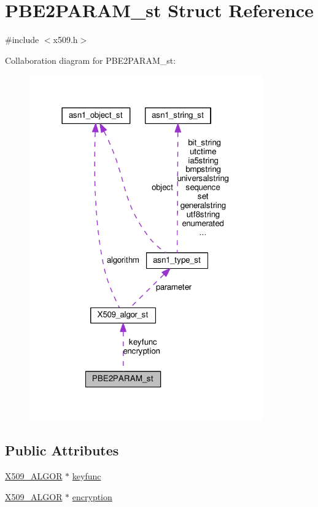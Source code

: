 \hypertarget{struct_p_b_e2_p_a_r_a_m__st}{}\section{P\+B\+E2\+P\+A\+R\+A\+M\+\_\+st Struct Reference}
\label{struct_p_b_e2_p_a_r_a_m__st}


{\ttfamily \#include $<$x509.\+h$>$}



Collaboration diagram for P\+B\+E2\+P\+A\+R\+A\+M\+\_\+st\+:
\nopagebreak
\begin{figure}[H]
\begin{center}
\leavevmode
\includegraphics[width=285pt]{struct_p_b_e2_p_a_r_a_m__st__coll__graph}
\end{center}
\end{figure}
\subsection*{Public Attributes}
\begin{DoxyCompactItemize}
\item 
\hyperlink{ossl__typ_8h_aa2b6185e6254f36f709cd6577fb5022e}{X509\+\_\+\+A\+L\+G\+OR} $\ast$ \hyperlink{struct_p_b_e2_p_a_r_a_m__st_a25475b98a4fde64162ffd0b124be4a62}{keyfunc}
\item 
\hyperlink{ossl__typ_8h_aa2b6185e6254f36f709cd6577fb5022e}{X509\+\_\+\+A\+L\+G\+OR} $\ast$ \hyperlink{struct_p_b_e2_p_a_r_a_m__st_a72b700e16f2dc2f87e2caa6cdce6a1c8}{encryption}
\end{DoxyCompactItemize}


